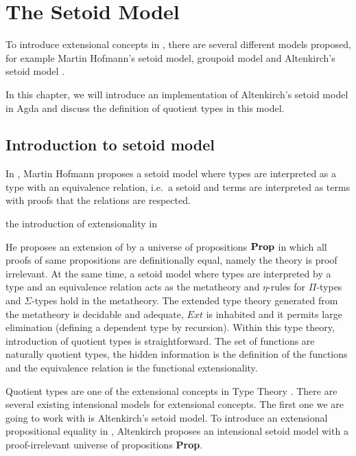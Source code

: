 \chapter{The Setoid Model}
\label{sm}





To introduce extensional concepts in \itt, there are several different models proposed, for example Martin Hofmann's setoid model, groupoid model and Altenkirch's setoid model \cite{alti:lics99}.

In this chapter, we will introduce an implementation of Altenkirch's setoid model in Agda and discuss the definition of quotient types in this model.



\section{Introduction to setoid model}

In \cite{hof:phd}, Martin Hofmann proposes a setoid model where types are interpreted as a type with
an equivalence relation, i.e.\ a setoid and terms are interpreted as terms with proofs that the relations are respected.

 the introduction of extensionality in \itt 


He proposes an extension of \itt by a universe of
propositions $\operatorname{\mathbf{Prop}}$ in which all proofs of same propositions are
definitionally equal, namely the theory is proof irrelevant. At the same time,
a setoid model where types are interpreted by a type and an equivalence relation acts as the metatheory and $\eta$-rules for
$\Pi$-types and $\Sigma$-types hold in the metatheory. The extended type
theory generated from the metatheory is decidable and adequate, $Ext$ is
inhabited and it permits large elimination (defining a dependent type by recursion). Within this type theory,
introduction of quotient types is straightforward. 
The set of functions are naturally quotient types, the hidden information is the
definition of the functions and the equivalence relation is the
functional extensionality.






Quotient types are one of the extensional concepts in Type Theory \cite{hof:phd}. There are several existing intensional models for extensional
concepts. The first one we are going to work with is Altenkirch's
setoid model. To introduce an extensional propositional equality in \itt{}, 
Altenkirch \cite{alti:lics99} proposes an intensional setoid model
with a proof-irrelevant universe of propositions \textbf{Prop}.


